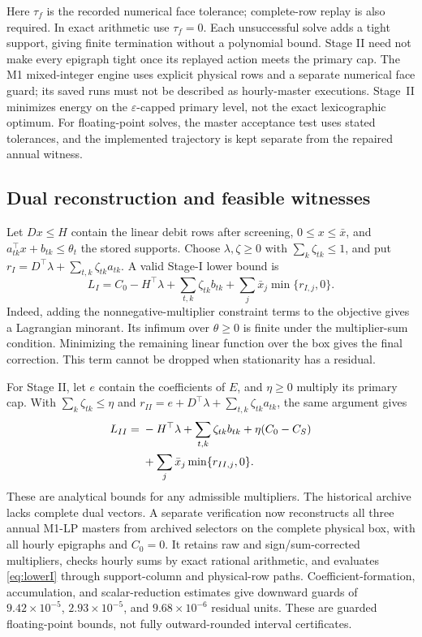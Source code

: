 \documentclass[10pt,journal]{IEEEtran}
\begin{document}
Here $\tau_f$ is the recorded numerical face tolerance; complete-row replay is also required. In exact arithmetic use $\tau_f=0$. Each unsuccessful solve adds a tight support, giving finite termination without a polynomial bound. Stage II need not make every epigraph tight once its replayed action meets the primary cap. The M1 mixed-integer engine uses explicit physical rows and a separate numerical face guard; its saved runs must not be described as hourly-master executions. Stage~II minimizes energy on the $\varepsilon$-capped primary level, not the exact lexicographic optimum. For floating-point solves, the master acceptance test uses stated tolerances, and the implemented trajectory is kept separate from the repaired annual witness.

\subsection{Dual reconstruction and feasible witnesses}
Let $Dx\leq H$ contain the linear debit rows after screening, $0\leq x\leq\bar x$, and $a_{tk}^\top x+b_{tk}\leq\theta_t$ the stored supports. Choose $\lambda,\zeta\geq0$ with $\sum_k\zeta_{tk}\leq1$, and put $r_I=D^\top\lambda+\sum_{t,k}\zeta_{tk}a_{tk}$. A valid Stage-I lower bound is
\begin{equation}
L_I=C_0-H^\top\lambda+\sum_{t,k}\zeta_{tk}b_{tk}
+\sum_j\bar x_j\min\{r_{I,j},0\}.
\label{eq:lowerI}
\end{equation}
Indeed, adding the nonnegative-multiplier constraint terms to the objective gives a Lagrangian minorant. Its infimum over $\theta\geq0$ is finite under the multiplier-sum condition. Minimizing the remaining linear function over the box gives the final correction. This term cannot be dropped when stationarity has a residual.

For Stage II, let $e$ contain the coefficients of $E$, and $\eta\geq0$ multiply its primary cap. With $\sum_k\zeta_{tk}\leq\eta$ and $r_{II}=e+D^\top\lambda+\sum_{t,k}\zeta_{tk}a_{tk}$, the same argument gives
\begin{align}
L_{II}={}&-H^\top\lambda+\sum_{t,k}\zeta_{tk}b_{tk}
+\eta(C_0-C_S)\notag\\
&+\sum_j\bar x_j\min\{r_{II,j},0\}.
\label{eq:lowerII}
\end{align}
These are analytical bounds for any admissible multipliers. The historical archive lacks complete dual vectors. A separate verification now reconstructs all three annual M1-LP masters from archived selectors on the complete physical box, with all hourly epigraphs and $C_0=0$. It retains raw and sign/sum-corrected multipliers, checks hourly sums by exact rational arithmetic, and evaluates \eqref{eq:lowerI} through support-column and physical-row paths. Coefficient-formation, accumulation, and scalar-reduction estimates give downward guards of $9.42\times10^{-5}$, $2.93\times10^{-5}$, and $9.68\times10^{-6}$ residual units. These are guarded floating-point bounds, not fully outward-rounded interval certificates.
\end{document}
